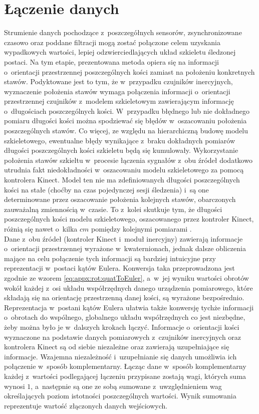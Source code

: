 \section{Łączenie danych}

Strumienie danych pochodzące z~poszczegółnych sensorów, zsynchronizowane czasowo oraz poddane filtracji mogą zostać połączone celem uzyskania wypadkowych wartości, lepiej odzwierciedlających układ szkieletu śledzonej postaci. Na tym etapie, prezentowana metoda opiera się na informacji o~orientacji przestrzennej poszczególnych kości zamiast na położeniu konkretnych stawów. Podyktowane jest to tym, że w~przypadku czujników inercyjnych, wyznaczenie położenia stawów wymaga połączenia informacji o~orientacji przestrzennej czujników z~modelem szkieletowym zawierającym informację o~długościach poszczególnych kości. W~przypadku błędnego lub nie dokładnego pomiaru długości kości można spodziewać się błędów w~oszacowaniu położenia poszczególnych stawów. Co więcej, ze względu na hierarchiczną budowę modelu szkieletowego, ewentualne błędy wynikające z~braku dokładnych pomiarów długości poszczególnych kości szkieletu będą się kumulowały. 
Wykorzystanie położenia stawów szkieltu w~procesie łączenia sygnałów z~obu źródeł dodatkowo utrudnia fakt niedokładności w~oszacowaniu modelu szkieletowego za pomocą kontrolera Kinect. Model ten nie ma zdefiniowanych długości poszczególnych kości na stałe (choćby na czas pojedynczej sesji śledzenia) i~są one determinowane przez oszacowanie położenia kolejnych stawów, obarczonych zauważalną zmiennością w~czasie. To z~kolei skutkuje tym, że długości poszczególnych kości modelu szkieletowego, oszacowanego przez kontroler Kinect, różnią się nawet o~kilka $cm$ pomiędzy kolejnymi pomiarami .\\

Dane z~obu źródeł (kontroler Kinect i~moduł inercyjny) zawierają informacje o~orientacji przestrzennej wyrażone w~kwaternionach, jednak dalsze obliczenia mające na celu połączenie tych informacji są bardziej intuicyjne przy reprezentacji w~postaci kątów Eulera. Konwersja taka przeprowadzona jest zgodnie ze wzorem \eqref{eq:appx:rot:quatToEuler}, a~w~jej wyniku wartości obrotów wokół każdej z~osi układu współrzędnych danego urządzenia pomiarowego, które składają się na orientację przestrzenną danej kości, są wyrażone bezpośrednio. Reprezentacja w~postani kątów Eulera ułatwia także konwersję tychże informacji o~obrotach do wspólnego, globalnego układu współrzędnych co jest niezbędne, żeby można było je w~dalszych krokach łączyć. 
Informacje o~orientacji kości wyznaczone na podstawie danych pomiarowych z~czujników inercyjnych oraz kontrolera Kinect są od siebie niezależne oraz zawierają uzupełniające się informacje. Wzajemna niezależność i~uzupełnianie się danych umożliwia ich połączenie w~sposób komplementarny. Łącząc dane w~sposób komplementarny każdej z~wartości podlegającej łączeniu przypisane zostają wagi, których suma wynosi $1$, a~następnie są one ze sobą sumowane z~uwzględnieniem wag określających poziom istotności poszczególnych wartości. Wynik sumowania reprezentuje wartość złączonych danych wejściowych. \\
 
